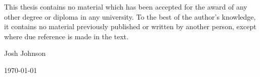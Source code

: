 \thispagestyle{empty}
\newpage
\vspace*{4cm}
This thesis contains no material which has been accepted for the award of any other degree or diploma in any university. To the best of the author's knowledge, it contains no material previously published or written by another person, except where due reference is made in the text. \par
\vspace{4cm}
Josh Johnson \par
\today